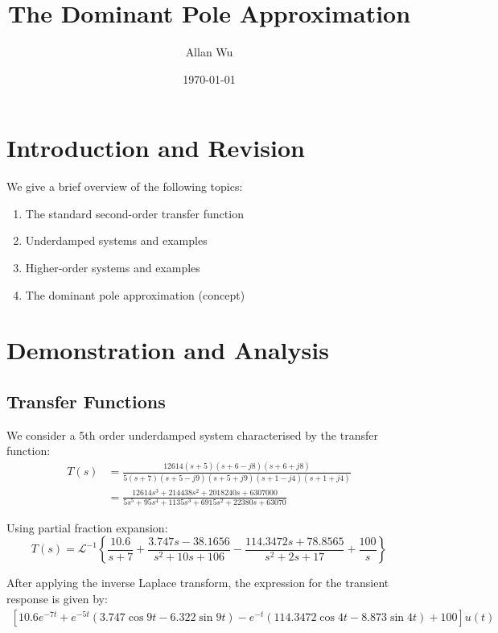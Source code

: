 \documentclass[12pt]{article}
\title{The Dominant Pole Approximation}
\author{Allan Wu}
\date{\today}
\begin{document}
\maketitle{}

\section*{Introduction and Revision}

We give a brief overview of the following topics:
\begin{enumerate}
\item The standard second-order transfer function
\item Underdamped systems and examples
\item Higher-order systems and examples
\item The dominant pole approximation (concept)
\end{enumerate}

\section*{Demonstration and Analysis}

\subsection*{Transfer Functions}

We consider a 5th order underdamped system characterised by the transfer function:
\begin{align*}
T(s) &= \frac{12614(s+5)(s+6-j8)(s+6+j8)}{5(s+7)(s+5-j9)(s+5+j9)(s+1-j4)(s+1+j4)} \\
&= \frac{12614 s^3 + 214438 s^2 + 2018240 s + 6307000}{5 s^5 + 95 s^4 + 1135 s^3 + 6915 s^2 + 22380 s + 63070}
\end{align*}

Using partial fraction expansion:
\begin{equation}
T(s) = \mathcal{L}^{-1} \left\{ \frac{10.6}{s+7}+\frac{3.747 s-38.1656}{s^{2}+10 s+106}-\frac{114.3472 s+78.8565}{s^{2}+2 s+17}+\frac{100}{s} \right\}
\end{equation}

After applying the inverse Laplace transform, the expression for the transient response is given by:
\begin{align*}
\left[ 10.6e^{-7t}+e^{-5t}\left(3.747\cos9t-6.322\sin9t\right)-e^{-t}\left(114.3472\cos4t-8.873\sin4t\right)+100 \right] u(t)
\end{align*}
\end{document}
